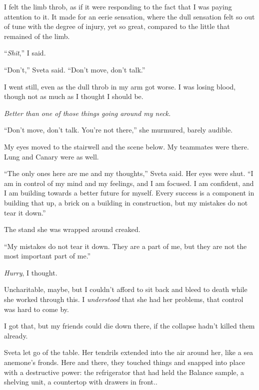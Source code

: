 I felt the limb throb, as if it were responding to the fact that I was paying attention to it.  It made for an eerie sensation, where the dull sensation felt so out of tune with the degree of injury, yet so great, compared to the little that remained of the limb.



``\emph{Shit},'' I said.



``Don't,'' Sveta said.  ``Don't move, don't talk.''



I went still, even as the dull throb in my arm got worse.  I was losing blood, though not as much as I thought I should be.



\emph{Better than one of those things going around my neck.}



``Don't move, don't talk.  You're not there,'' she murmured, barely audible.



My eyes moved to the stairwell and the scene below.  My teammates were there.  Lung and Canary were as well.



``The only ones here are me and my thoughts,'' Sveta said.  Her eyes were shut.  ``I am in control of my mind and my feelings, and I am focused.  I am confident, and I am building towards a better future for myself.  Every success is a component in building that up, a brick on a building in construction, but my mistakes do not tear it down.''



The stand she was wrapped around creaked.



``My mistakes do not tear it down.  They are a part of me, but they are not the most important part of me.''



\emph{Hurry}, I thought.



Uncharitable, maybe, but I couldn't afford to sit back and bleed to death while she worked through this.  I \emph{understood} that she had her problems, that control was hard to come by.



I got that, but my friends could die down there, if the collapse hadn't killed them already.



Sveta let go of the table.  Her tendrils extended into the air around her, like a sea anemone's fronds.  Here and there, they touched things and snapped into place with a destructive power: the refrigerator that had held the Balance sample, a shelving unit, a countertop with drawers in front..



